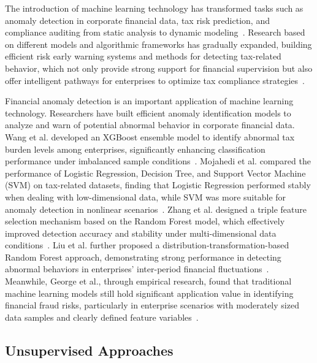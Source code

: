 The introduction of machine learning technology has transformed tasks such as anomaly detection in corporate financial data, tax risk prediction, and compliance auditing from static analysis to dynamic modeling~\cite{olorunyomi2022dynamic,bello2024implementing}. Research based on different models and algorithmic frameworks has gradually expanded, building efficient risk early warning systems and methods for detecting tax-related behavior, which not only provide strong support for financial supervision but also offer intelligent pathways for enterprises to optimize tax compliance strategies~\cite{yang2025predictive}.

Financial anomaly detection is an important application of machine learning technology. Researchers have built efficient anomaly identification models to analyze and warn of potential abnormal behavior in corporate financial data. Wang et al. developed an XGBoost ensemble model to identify abnormal tax burden levels among enterprises, significantly enhancing classification performance under imbalanced sample conditions~\cite{wang2022hybrid}. Mojahedi et al. compared the performance of Logistic Regression, Decision Tree, and Support Vector Machine (SVM) on tax-related datasets, finding that Logistic Regression performed stably when dealing with low-dimensional data, while SVM was more suitable for anomaly detection in nonlinear scenarios~\cite{mojahedi2022towards}. Zhang et al. designed a triple feature selection mechanism based on the Random Forest model, which effectively improved detection accuracy and stability under multi-dimensional data conditions~\cite{zhang2023three}. Liu et al. further proposed a distribution-transformation-based Random Forest approach, demonstrating strong performance in detecting abnormal behaviors in enterprises' inter-period financial fluctuations~\cite{liu2025self}. Meanwhile, George et al., through empirical research, found that traditional machine learning models still hold significant application value in identifying financial fraud risks, particularly in enterprise scenarios with moderately sized data samples and clearly defined feature variables~\cite{george2024predictive}.

\subsection{Unsupervised Approaches}

